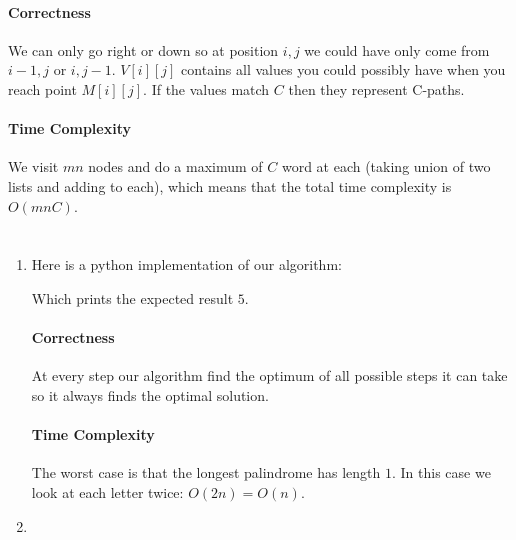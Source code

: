 \documentclass[12pt, a4paper]{article}
\begin{document}
\begin{enumerate}[a]
	\paragraph{Correctness}

	We can only go right or down so at position $i, j$ we could have only come from $i - 1, j$ or $i, j - 1$. $V[i][j]$ contains all values you could possibly have when you reach point $M[i][j]$. If the values match $C$ then they represent C-paths.

	\paragraph{Time Complexity}

	We visit $mn$ nodes and do a maximum of $C$ word at each (taking union of two lists and adding to each), which means that the total time complexity is $O(mnC)$.

\end{enumerate}

\section{} %
\begin{enumerate}[a]
	\item %
	Here is a python implementation of our algorithm:

	

	Which prints the expected result $5$.

	\paragraph{Correctness}

	At every step our algorithm find the optimum of all possible steps it can take so it always finds the optimal solution.

	\paragraph{Time Complexity}

	The worst case is that the longest palindrome has length $1$. In this case we look at each letter twice: $O(2n) = O(n)$.

	\item %
\end{enumerate}
\end{document}
